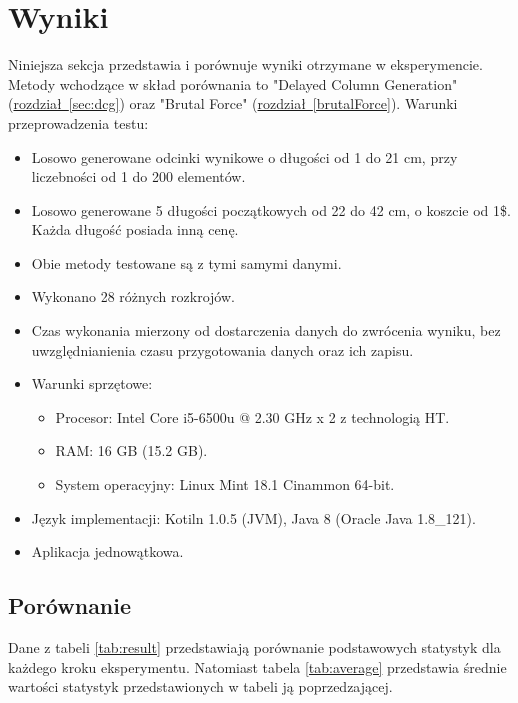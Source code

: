 \section{Wyniki}

Niniejsza sekcja przedstawia i porównuje wyniki otrzymane w eksperymencie. Metody wchodzące w skład porównania to "Delayed Column Generation" (\hyperref[sec:dcg]{rozdział~\ref*{sec:dcg}}) oraz "Brutal Force" (\hyperref[brutalForce]{rozdział~\ref*{brutalForce}}). Warunki przeprowadzenia testu:
\begin{itemize}
  \item Losowo generowane odcinki wynikowe o długości od 1 do 21 cm, przy liczebności od 1 do 200 elementów.
  \item Losowo generowane 5 długości początkowych od 22 do 42 cm, o koszcie od 1\$. Każda długość posiada inną cenę.
  \item Obie metody testowane są z tymi samymi danymi.
  \item Wykonano 28 różnych rozkrojów.
  \item Czas wykonania mierzony od dostarczenia danych do zwrócenia wyniku, bez uwzględnianienia czasu przygotowania danych oraz ich zapisu.
  \item Warunki sprzętowe:
  \begin{itemize}
    \item Procesor: Intel Core i5-6500u @ 2.30 GHz x 2 z technologią HT.
    \item RAM: 16 GB (15.2 GB).
    \item System operacyjny: Linux Mint 18.1 Cinammon 64-bit.
  \end{itemize}
  \item Język implementacji: Kotiln 1.0.5 (JVM), Java 8 (Oracle Java 1.8\_121).
  \item Aplikacja jednowątkowa.
\end{itemize}
\subsection{Porównanie}

Dane z tabeli \ref{tab:result} przedstawiają porównanie podstawowych statystyk dla każdego kroku eksperymentu. Natomiast tabela \ref{tab:average} przedstawia średnie wartości statystyk przedstawionych w tabeli ją poprzedzającej.

